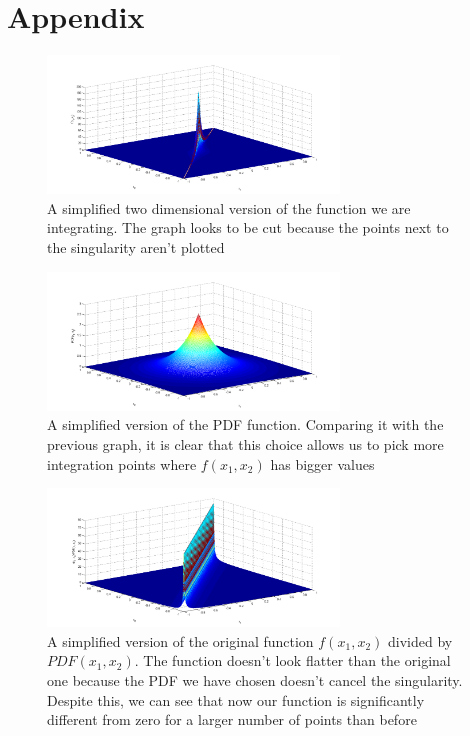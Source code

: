 \documentclass[10pt,a4paper,titlepage]{article}
\begin{document}
\section{Appendix}
\begin{figure}[H]
	\begin{center}
        \includegraphics[width=0.69\textwidth]{f.png}
    	\caption{A simplified two dimensional version of the function we are integrating. The graph looks to be cut because the points next to the singularity aren't plotted}
	\end{center}
\end{figure}
\begin{figure}[H]
	\begin{center}
        \includegraphics[width=0.69\textwidth]{correction.png}
    	\caption{A simplified version of the PDF function. Comparing it with the previous graph, it is clear that this choice allows us to pick more integration points where $f(x_1,x_2)$ has bigger values}
	\end{center}
\end{figure}
\begin{figure}[H]
\begin{center}
    \includegraphics[width=0.69\textwidth]{result.png}
\caption{A simplified version of the original function $f(x_1,x_2)$ divided by $PDF(x_1,x_2)$. The function doesn't look flatter than the original one because the PDF we have chosen doesn't cancel the singularity. Despite this, we can see that now our function is significantly different from zero for a larger number of points than before}
	\end{center}
\end{figure}
\end{document}
